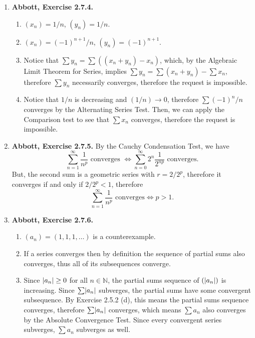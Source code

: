 \documentclass{article}
\DeclarePairedDelimiter\abs{\lvert}{\rvert}
\newcommand{\N}{\mathbb{N}}
\newcommand{\ra}{\rightarrow}
\newcommand{\exc}[2][Abbott]{\item \textbf{#1, Exercise #2.}}
\begin{document}
\begin{enumerate}
    \exc{2.7.4}
    \begin{enumerate}
        \item $(x_n) = 1/n$, $(y_n) = 1/n$.
        
        \item $(x_n) = (-1)^{n+1}/n$, $(y_n) = (-1)^{n+1}$.
        
        \item Notice that $\sum y_n = \sum ((x_n + y_n) - x_n)$, which, by the Algebraic Limit Theorem for Series, implies $\sum y_n = \sum  (x_n + y_n) - \sum x_n$, therefore $\sum y_n$ necessarily converges, therefore the request is impossible.
        
        \item Notice that $1/n$ is decreasing and $(1/n) \ra 0$, therefore $\sum (-1)^n/n$ converges by the Alternating Series Test. Then, we can apply the Comparison test to see that $\sum x_n$ converges, therefore the request is impossible.
    \end{enumerate}
    
    \exc{2.7.5} By the Cauchy Condensation Test, we have 
    \begin{equation*}
        \sum_{n=1}^\infty \frac{1}{n^p} \text{ converges } \iff 
        \sum_{n=0}^\infty 2^n \frac{1}{2^{n p}} \text{ converges.} 
    \end{equation*} But, the second sum is a geometric series with $r = 2/2^p$, therefore it converges if and only if $2/2^p < 1$, therefore 
    \begin{equation*}
        \sum_{n=1}^\infty \frac{1}{n^p} \text{ converges} \iff p > 1.
    \end{equation*}
    
    \exc{2.7.6}
    \begin{enumerate}
        \item $(a_n) = (1,1,1,\dots)$ is a counterexample.
        
        \item If a series converges then by definition the sequence of partial sums also converges, thus all of its subsequences converge.
        
        \item Since $\abs{a_n} \geq 0$ for all $n \in \N$, the partial sums sequence of $(\abs{a_n})$ is increasing. Since $\sum \abs{a_n}$ subverges, the partial sums have some convergent subsequence. By Exercise 2.5.2 (d), this means the partial sums sequence converges, therefore $\sum \abs{a_n}$ converges, which means $\sum a_n$ also converges by the Absolute Convergence Test. Since every convergent series subverges, $\sum a_n$ subverges as well.
        

\end{enumerate}
\end{enumerate}
\end{document}
